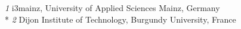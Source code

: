\textit{1}  i3mainz, University of Applied Sciences Mainz, Germany         \\*                                                                
\textit{2}  Dijon Institute of Technology, Burgundy University, France